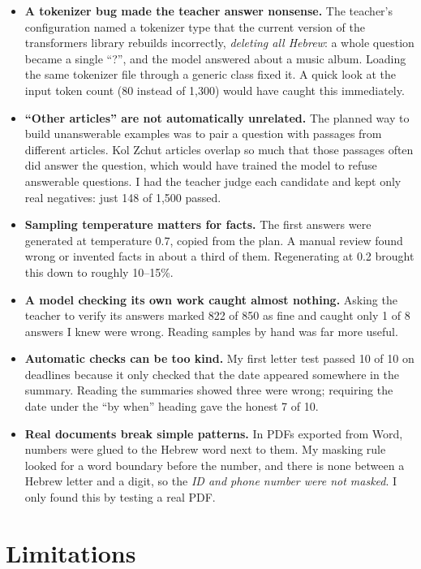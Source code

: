 \documentclass[11pt]{article}
\begin{document}
\begin{itemize}
\item \textbf{A tokenizer bug made the teacher answer nonsense.} The teacher's configuration named a tokenizer type that the current version of the transformers library rebuilds incorrectly, \emph{deleting all Hebrew}: a whole question became a single ``?'', and the model answered about a music album. Loading the same tokenizer file through a generic class fixed it. A quick look at the input token count (80 instead of 1,300) would have caught this immediately.
\item \textbf{``Other articles'' are not automatically unrelated.} The planned way to build unanswerable examples was to pair a question with passages from different articles. Kol Zchut articles overlap so much that those passages often did answer the question, which would have trained the model to refuse answerable questions. I had the teacher judge each candidate and kept only real negatives: just 148 of 1,500 passed.
\item \textbf{Sampling temperature matters for facts.} The first answers were generated at temperature 0.7, copied from the plan. A manual review found wrong or invented facts in about a third of them. Regenerating at 0.2 brought this down to roughly 10--15\%.
\item \textbf{A model checking its own work caught almost nothing.} Asking the teacher to verify its answers marked 822 of 850 as fine and caught only 1 of 8 answers I knew were wrong. Reading samples by hand was far more useful.
\item \textbf{Automatic checks can be too kind.} My first letter test passed 10 of 10 on deadlines because it only checked that the date appeared somewhere in the summary. Reading the summaries showed three were wrong; requiring the date under the ``by when'' heading gave the honest 7 of 10.
\item \textbf{Real documents break simple patterns.} In PDFs exported from Word, numbers were glued to the Hebrew word next to them. My masking rule looked for a word boundary before the number, and there is none between a Hebrew letter and a digit, so the \emph{ID and phone number were not masked}. I only found this by testing a real PDF.
\end{itemize}

\section{Limitations}
\end{document}
